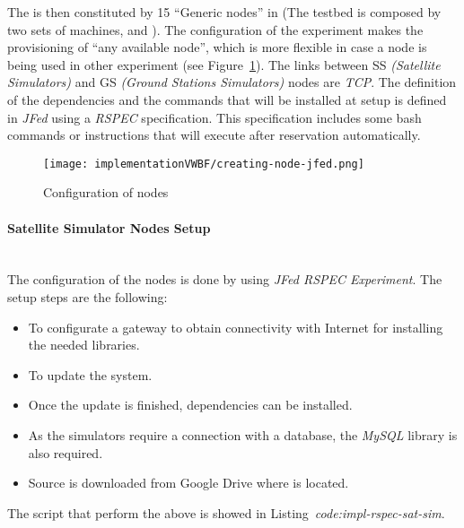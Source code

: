 \begin{itemize}
The \sss is then constituted by 15 ``Generic nodes'' in  (The \vw
testbed is composed by two sets of machines,  and ). The configuration of the experiment makes the provisioning of ``any available node'',
which is more flexible in case a node is being used in other experiment (see Figure~\ref{fig:creating-node-jfed}). The links between SS \emph{(Satellite Simulators)} and GS \emph{(Ground Stations Simulators)} nodes
are \emph{TCP}. The definition of the dependencies and the commands that will be installed at
setup is defined in \emph{JFed} using a \emph{RSPEC} specification. This specification includes some
bash commands or instructions that will execute after reservation automatically.


\begin{figure}[!h]
\begin{center}
\texttt{[image: implementationVWBF/creating-node-jfed.png]}

\caption{Configuration of \vw nodes}
\label{fig:creating-node-jfed}
\end{center}
\end{figure}


\paragraph{Satellite Simulator Nodes Setup}~\\

The configuration of the nodes is done by using \emph{JFed RSPEC Experiment}. The
setup steps are the following:
\begin{itemize}
\item To configurate a gateway to obtain connectivity with Internet for installing the
  needed libraries.
\item To update the system.
\item Once the update is finished, dependencies can be installed.
\item As the simulators require a connection with a database, the \emph{MySQL} library is
  also required. 
\item Source is downloaded from Google Drive where is located.
\end{itemize}

The script that perform the above is showed in Listing~\emph{code:impl-rspec-sat-sim}.

\begin{listing}[
  float=h!,
  caption  = {RSPEC specification for \emph{Satellite Simulators}},
  label    = code:impl-rspec-sat-sim,
  style=customc]


\end{listing}
\end{itemize}
